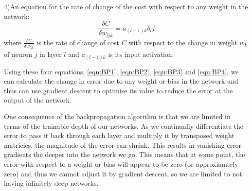 4)An equation for the rate of change of the cost with respect to any weight in the network:
\begin{equation} \label{eqn:BP4}
\frac{\delta C}{\delta w_{ljk}} = a_{(l-1)k}\delta_lj
\end{equation}
where $\frac{\delta C}{\delta w_{ljk}}$ is the rate of change of cost $C$ with respect to the change in weight $w_k$ of neuron $j$ in layer $l$ and $a_{(l-1)k}$ is its input activation.

Using these four equations, \autoref{eqn:BP1}, \autoref{eqn:BP2}, \autoref{eqn:BP3} and \autoref{eqn:BP4}, we can calculate the change in error due to any weight or bias in the network and thus can use gradient descent to optimise its value to reduce the error at the output of the network.

One consequence of the backpropagation algorithm is that we are limited in terms of the trainable depth of our networks. As we continually differentiate the error to pass it back through each layer and multiply it by transposed weight matricies, the magnitude of the error can shrink. This results in vanishing error gradients the deeper into the network we go. This means that at some point, the error with respect to a weight or bias will appear to be zero (or approxiamtely zero) and thus we cannot adjust it by gradient descent, so we are limited to not having infinitely deep networks.

\theendnotes